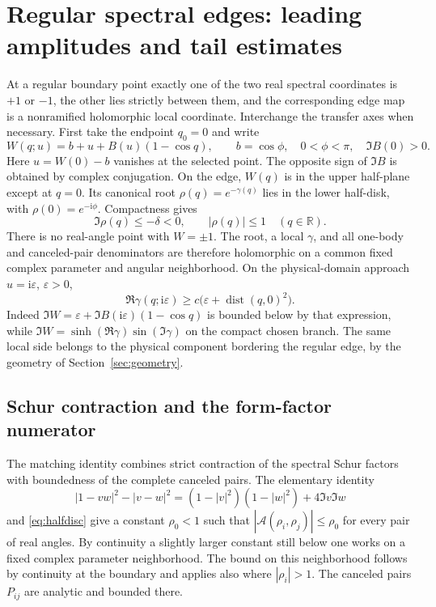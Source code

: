 \documentclass[11pt]{article}
\numberwithin{equation}{section}
\theoremstyle{definition}
\newcommand{\R}{\mathbb R}
\newcommand{\ii}{\mathrm i}
\newcommand{\eps}{\varepsilon}
\newcommand{\dist}{\operatorname{dist}}
\newcommand{\cA}{\mathscr A}
\begin{document}
\section{Regular spectral edges: leading amplitudes and tail estimates}
\label{sec:regular}

At a regular boundary point exactly one of the two real spectral
coordinates is $+1$ or $-1$, the other lies strictly between them, and
the corresponding edge map is a nonramified holomorphic local
coordinate. Interchange the transfer axes when necessary. First take
the endpoint $q_0=0$ and write
\begin{equation}\label{eq:positiveedge}
 W(q;u)=b+u+B(u)(1-\cos q),\qquad
 b=\cos\phi,\quad 0<\phi<\pi,\quad \Im B(0)>0.
\end{equation}
Here $u=W(0)-b$ vanishes at the selected point. The opposite sign of
$\Im B$ is obtained by complex conjugation. On the edge, $W(q)$ is
in the upper half-plane except at $q=0$. Its canonical root
$\rho(q)=e^{-\gamma(q)}$ lies in the lower half-disk, with
$\rho(0)=e^{-\ii\phi}$. Compactness gives
\begin{equation}\label{eq:halfdisc}
 \Im\rho(q)\le-\delta<0,\qquad |\rho(q)|\le1
 \quad(q\in\R).
\end{equation}
There is no real-angle point with $W=\pm1$. The root, a local
$\gamma$, and all one-body and canceled-pair denominators are therefore
holomorphic on a common fixed complex parameter and angular
neighborhood. On the physical-domain approach $u=\ii\eps$, $\eps>0$,
\begin{equation}\label{eq:attenuation}
 \Re\gamma(q;\ii\eps)\ge c\bigl(\eps+\dist(q,0)^2\bigr).
\end{equation}
Indeed $\Im W=\eps+\Im B(\ii\eps)(1-\cos q)$ is bounded below by
that expression, while
$\Im W=\sinh(\Re\gamma)\sin(\Im\gamma)$ on the compact chosen branch.
The same local side belongs to the physical component bordering the
regular edge, by the geometry of Section~\ref{sec:geometry}.

\subsection{Schur contraction and the form-factor numerator}

The matching identity combines strict contraction of the spectral
Schur factors with boundedness of the complete canceled pairs.
The elementary identity
\begin{equation}\label{eq:schurdifference}
 |1-vw|^2-|v-w|^2
 =(1-|v|^2)(1-|w|^2)+4\Im v\Im w
\end{equation}
and \eqref{eq:halfdisc} give a constant $\rho_0<1$ such that
$|\cA(\rho_i,\rho_j)|\le\rho_0$ for every pair of real angles.
By continuity a slightly larger constant still below one works on a
fixed complex parameter neighborhood. The bound on this neighborhood
follows by continuity at the boundary and applies also where
$|\rho_i|>1$. The canceled pairs $P_{ij}$ are analytic and bounded
there.
\end{document}
